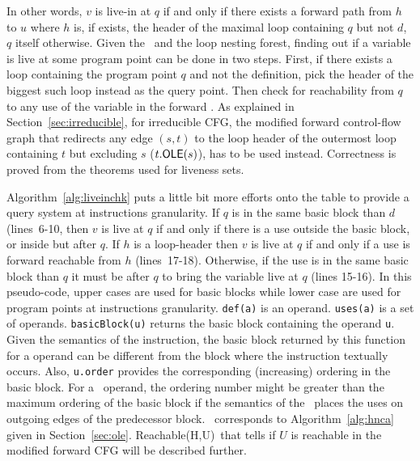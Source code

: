In other words, $v$ is live-in at $q$ if and only if there exists a forward path from $h$ to $u$ where $h$ is, if exists, the header of the maximal loop containing $q$ but not $d$, $q$ itself otherwise.
Given the \reducedGraph\ and the loop nesting forest, finding out if a variable is live at some program point can be done in two steps.
First, if there exists a loop containing the program point $q$ and not the definition, pick the header of the biggest such loop instead as the query point.
Then check for reachability from $q$ to any use of the variable in the forward \@CFG.
As explained in Section~\ref{sec:irreducible}, for irreducible CFG, the modified forward control-flow graph that redirects any edge $(s,t)$ to the loop header of the outermost loop containing $t$ but excluding $s$ ($t.\textsf{OLE}(s)$), has to be used instead.
Correctness is proved from the theorems used for liveness sets.

\newcommand{\BB}[1]{\textsf{basicBlock}(#1)}
\newcommand{\ordering}[1]{\textsf{order}(#1)}
\newcommand{\isLoopHeader}[1]{\textsf{isLoopHeader}(#1)}
\newcommand{\FR}[2]{\textsf{{\reduced}Reachable}(#1,#2)}

Algorithm~\ref{alg:liveinchk} puts a little bit more efforts onto the table to provide a query system at instructions granularity.
If $q$ is in the same basic block than $d$ (lines~6-10, then $v$ is live at $q$ if and only if there is a use outside the basic block, or inside but after $q$.
If $h$ is a loop-header then $v$ is live at $q$ if and only if a use is forward reachable from $h$ (lines~17-18).
Otherwise, if the use is in the same basic block than $q$ it must be after $q$ to bring the variable live at $q$ (lines 15-16).
In this pseudo-code, upper cases are used for basic blocks while lower case are used for program points at instructions granularity.
\texttt{def(a)} is an operand.
\texttt{uses(a)} is a set of operands.
\texttt{\BB{u}} returns the basic block containing the operand \texttt{u}.
Given the semantics of the \phifun instruction, the basic block returned by this function for a \phifun operand can be different from the block where the instruction textually occurs.
Also, \texttt{u.order} provides the corresponding (increasing) ordering in the basic block.
For a \phifun\ operand, the ordering number might be greater than the maximum ordering of the basic block if the semantics of the \phifun\ places the uses on outgoing edges of the predecessor block.
\ corresponds to Algorithm~\ref{alg:hnca} given in Section~\ref{sec:ole}.
\FR{H}{U}\ that tells if $U$ is reachable in the modified forward CFG will be described further.

